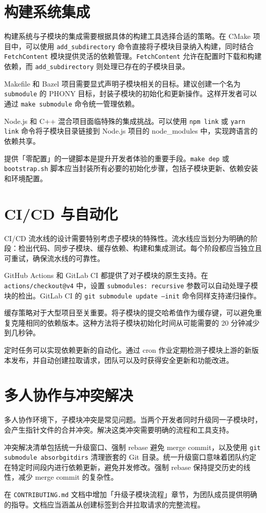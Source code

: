 \chapter{构建系统集成}
构建系统与子模块的集成需要根据具体的构建工具选择合适的策略。在 CMake 项目中，可以使用 \texttt{add\_{}subdirectory} 命令直接将子模块目录纳入构建，同时结合 \texttt{FetchContent} 模块提供灵活的依赖管理。\texttt{FetchContent} 允许在配置时下载和构建依赖，而 \texttt{add\_{}subdirectory} 则处理已存在的子模块目录。\par
Makefile 和 Bazel 项目需要显式声明子模块相关的目标。建议创建一个名为 \texttt{submodule} 的 PHONY 目标，封装子模块的初始化和更新操作。这样开发者可以通过 \texttt{make submodule} 命令统一管理依赖。\par
Node.js 和 C++ 混合项目面临特殊的集成挑战。可以使用 \texttt{npm link} 或 \texttt{yarn link} 命令将子模块目录链接到 Node.js 项目的 node\_{}modules 中，实现跨语言的依赖共享。\par
提供「零配置」的一键脚本是提升开发者体验的重要手段。\texttt{make dep} 或 \texttt{bootstrap.sh} 脚本应当封装所有必要的初始化步骤，包括子模块更新、依赖安装和环境配置。\par
\chapter{CI/CD 与自动化}
CI/CD 流水线的设计需要特别考虑子模块的特殊性。流水线应当划分为明确的阶段：检出代码、同步子模块、缓存依赖、构建和集成测试。每个阶段都应当独立且可重试，确保流水线的可靠性。\par
GitHub Actions 和 GitLab CI 都提供了对子模块的原生支持。在 \texttt{actions/checkout@v4} 中，设置 \texttt{submodules: recursive} 参数可以自动处理子模块的检出。GitLab CI 的 \texttt{git submodule update --init} 命令同样支持递归操作。\par
缓存策略对于大型项目至关重要。将子模块的提交哈希值作为缓存键，可以避免重复克隆相同的依赖版本。这种方法将子模块初始化时间从可能需要的 20 分钟减少到几秒钟。\par
定时任务可以实现依赖更新的自动化。通过 cron 作业定期检测子模块上游的新版本发布，并自动创建拉取请求，团队可以及时获得安全更新和功能改进。\par
\chapter{多人协作与冲突解决}
多人协作环境下，子模块冲突是常见问题。当两个开发者同时升级同一子模块时，会产生指针文件的合并冲突。解决这类冲突需要明确的流程和工具支持。\par
冲突解决清单包括统一升级窗口、强制 rebase 避免 merge commit，以及使用 \texttt{git submodule absorbgitdirs} 清理嵌套的 Git 目录。统一升级窗口意味着团队约定在特定时间段内进行依赖更新，避免并发修改。强制 rebase 保持提交历史的线性，减少 merge commit 的复杂性。\par
在 \texttt{CONTRIBUTING.md} 文档中增加「升级子模块流程」章节，为团队成员提供明确的指导。文档应当涵盖从创建标签到合并拉取请求的完整流程。\par
